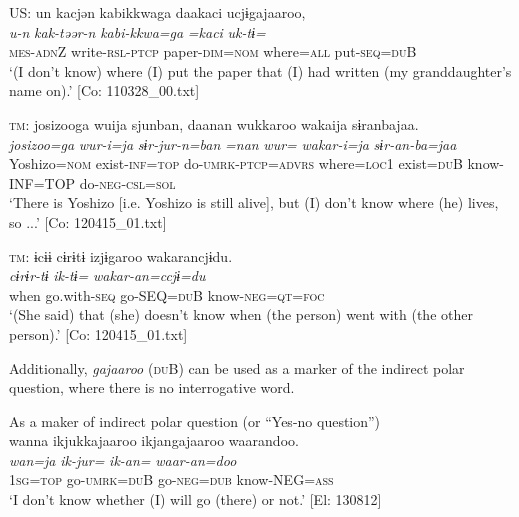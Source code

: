   \ex  US:  \glll un  kacjən  kabikkwaga  daakaci  ucjɨgajaaroo,\\
      \textit{u-n}  \textit{kak-təər-n}  \textit{kabi-kkwa=ga}  \textit{=kaci}  \textit{uk-tɨ=}\\
      \textsc{mes}-\textsc{adn}Z  write-\textsc{rsl}{}-\textsc{ptcp}  paper{}-\textsc{dim}=\textsc{nom}  where=\textsc{all}  put-\textsc{seq}=\textsc{du}B\\
      \glt       ‘(I don’t know) where (I) put the paper that (I) had written (my granddaughter’s name on).’ [Co: 110328\_00.txt]

  \ex  \textsc{tm}:
      \glll    {\textbar}josizoo{\textbar}ga  wuija  sjunban,  daanan wukkaroo  wakaija  sɨranbajaa.\\
      \textit{josizoo=ga}  \textit{wur-i=ja}  \textit{sɨr-jur-n=ban}  \textit{=nan}  \textit{wur=}  \textit{wakar-i=ja}  \textit{sɨr-an-ba=jaa}\\
      Yoshizo=\textsc{nom}  exist-\textsc{inf}=\textsc{top}  do-\textsc{umrk}-\textsc{ptcp}=\textsc{advrs}  where=\textsc{loc}1  exist=\textsc{du}B  know-INF=TOP  do-\textsc{neg}-\textsc{csl}=\textsc{sol}\\
      \glt       ‘There is Yoshizo [i.e. Yoshizo is still alive], but (I) don’t know where (he) lives, so ...’ [Co: 120415\_01.txt]

  \ex  \textsc{tm}:
      \glll    ɨcɨɨ  cɨrɨtɨ  izjɨgaroo  wakarancjɨdu.\\
      \textit{}  \textit{cɨrɨr-tɨ}  \textit{ik-tɨ=}  \textit{wakar-an=ccjɨ=du}\\
      when  go.with-\textsc{seq}  go-SEQ=\textsc{du}B  know-\textsc{neg}=\textsc{qt}=\textsc{foc}\\
      \glt       ‘(She said) that (she) doesn’t know when (the person) went with (the other person).’ [Co: 120415\_01.txt]
    \z
\z

Additionally, \textit{gajaaroo} (\textsc{du}B) can be used as a marker of the indirect polar question, where there is no interrogative word.

\ea\label{ex:10.82}   As a maker of indirect polar question (or “Yes-no question”)\\
      \glll    wanna  ikjukkajaaroo  ikjangajaaroo  waarandoo.\\
    \textit{wan=ja}  \textit{ik-jur=}  \textit{ik-an=}  \textit{waar-an=doo}\\
    1\textsc{sg}=\textsc{top}  go-\textsc{umrk}=\textsc{du}B  go-\textsc{neg}=\textsc{dub}  know-NEG=\textsc{ass}\\
    \glt     ‘I don’t know whether (I) will go (there) or not.’ [El: 130812]
\z

